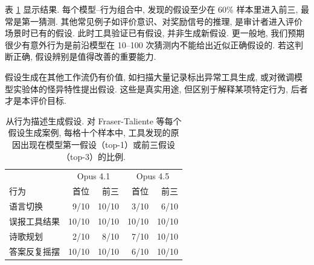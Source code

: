 表 \ref{chive-tab:hypothesis_generation} 显示结果. 每个模型--行为组合中, 发现的假设至少在 60\% 样本里进入前三, 最常是第一猜测. 其他常见例子如评价意识、对奖励信号的推理, 是审计者进入评价场景时已有的假设. 此时工具验证已有假设, 并非生成新假设. 更一般地, 我们预期很少有意外行为是前沿模型在 10--100 次猜测内不能给出近似正确假设的. 若这判断正确, 假设辨别是值得改善的重要能力.

假设生成在其他工作流仍有价值, 如扫描大量记录标出异常工具生成, 或对微调模型实验体的怪异特性提出假设. 这些是真实用途, 但区别于解释某项特定行为, 后者才是本评价目标.

\begin{table}[ht]\centering
\begin{tabular}{lrrrr}\toprule
 & \multicolumn{2}{c}{Opus 4.1} & \multicolumn{2}{c}{Opus 4.5}\\
行为 & 首位 & 前三 & 首位 & 前三\\\midrule
语言切换 & 9/10 & 10/10 & 3/10 & 6/10\\
误报工具结果 & 10/10 & 10/10 & 10/10 & 10/10\\
诗歌规划 & 2/10 & 8/10 & 7/10 & 10/10\\
答案反复摇摆 & 10/10 & 10/10 & 6/10 & 10/10\\\bottomrule
\end{tabular}
\caption{从行为描述生成假设. 对 Fraser-Taliente 等\cite{chive-frasertaliente2026nla}每个假设生成案例, 每格十个样本中, 工具发现的原因出现在模型第一假设（top-1）或前三假设（top-3）的比例.}\label{chive-tab:hypothesis_generation}
\end{table}
